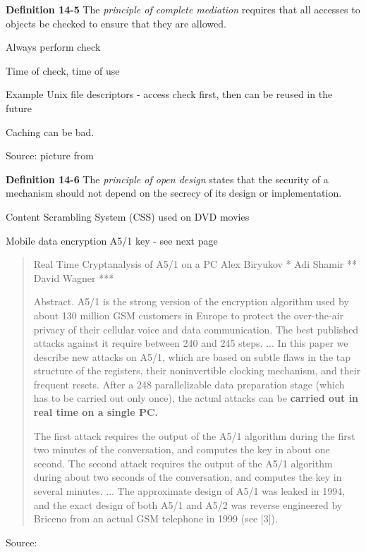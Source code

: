\documentclass[Screen16to9,17pt]{foils}
\begin{document}

\begin{list1}
\item {\bf Definition 14-5} The \emph{principle of complete mediation} requires that all accesses to objects be checked to ensure that they are allowed.
\item Always perform check
\item Time of check, time of use
\item Example Unix file descriptors - access check first, then can be reused in the future
\item Caching can be bad.
\end{list1}




Source: picture from 
\begin{list1}
\item {\bf Definition 14-6} The \emph{principle of open design} states that the security of a mechanism should not depend on the secrecy of its design or implementation.
\item Content Scrambling System (CSS) used on DVD movies
\item Mobile data encryption  A5/1 key - see next page
\end{list1}


\begin{quote}
  Real Time Cryptanalysis of A5/1 on a PC
Alex Biryukov * Adi Shamir ** David Wagner ***

  Abstract. A5/1 is the strong version of the encryption algorithm used by about 130 million GSM customers in Europe to protect the over-the-air privacy of their cellular voice and data communication. The best published attacks against it require between 240 and 245 steps. ...
  In this paper we describe new attacks on A5/1, which are based on subtle flaws in the tap structure of the registers, their noninvertible clocking mechanism, and their frequent resets. After a 248 parallelizable data preparation stage (which has to be carried out only once), the actual attacks can be {\bf carried out in real time on a single PC.}

  The first attack requires the output of the A5/1 algorithm during the first two minutes of the conversation, and computes the key in about one second. The second attack requires the output of the A5/1 algorithm during about two seconds of the conversation, and computes the key in several minutes.
  ...
  The approximate design of A5/1 was leaked in 1994, and the exact design of both A5/1 and A5/2 was reverse engineered by Briceno from an actual GSM telephone in 1999 (see [3]).
\end{quote}
Source: 
\end{document}
